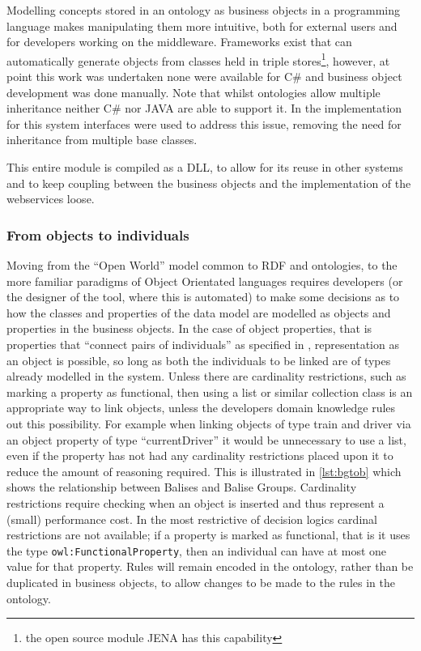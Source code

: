 Modelling concepts stored in an ontology as business objects in a programming language makes manipulating them more intuitive, both for external users and for developers working on the middleware. Frameworks exist that can automatically generate objects from classes held in triple stores\footnote{the open source module JENA has this capability}, however, at point this work was undertaken none were available for C\# and business object development was done manually. Note that whilst ontologies allow multiple inheritance neither C\# nor JAVA are able to support it. In the implementation for this system interfaces were used to address this issue, removing the need for inheritance from multiple base classes.

This entire module is compiled as a DLL, to allow for its reuse in other systems and to keep coupling between the business objects and the implementation of the webservices loose.
\subsubsection{From objects to individuals}
Moving from the ``Open World'' model common to RDF and ontologies, to the more familiar paradigms of Object Orientated languages requires developers (or the designer of the tool, where this is automated) to make some decisions as to how the classes and properties of the data model are modelled as objects and properties in the business objects. In the case of object properties, that is properties that \enquote{connect pairs of individuals} as specified in \citet{McGuinness04}, representation as an object is possible, so long as both the individuals to be linked are of types already modelled in the system. Unless there are cardinality restrictions, such as marking a property as functional, then using a list or similar collection class is an appropriate way to link objects, unless the developers domain knowledge rules out this possibility. For example when linking objects of type train and driver via an object property of type ``currentDriver'' it would be unnecessary to use a list, even if the property has not had any cardinality restrictions placed upon it to reduce the amount of reasoning required. This is illustrated in \autoref{lst:bgtob} which shows the relationship between Balises and Balise Groups. Cardinality restrictions require checking when an object is inserted and thus represent a (small) performance cost. In the most restrictive of decision logics cardinal restrictions are not available; if a property is marked as functional, that is it uses the type \texttt{owl:FunctionalProperty}, then an individual can have at most one value for that property. Rules will remain encoded in the ontology, rather than be duplicated in business objects, to allow changes to be made to the rules in the ontology.

